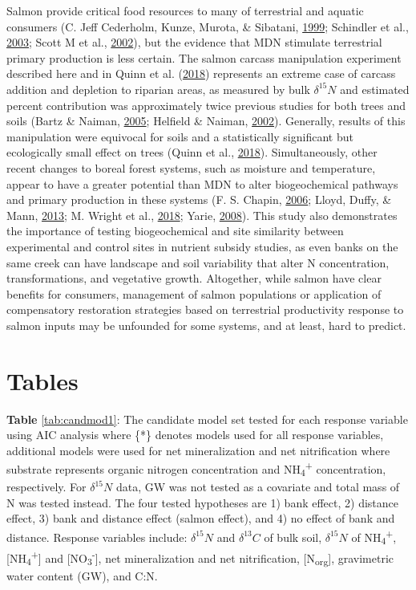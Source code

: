 \documentclass [11pt, proquest] {uwthesis}[2015/03/03]
\begin{document}
Salmon provide critical food resources to many of terrestrial and
aquatic consumers (C. Jeff Cederholm, Kunze, Murota, \& Sibatani,
\protect\hyperlink{ref-Cederholm1999}{1999}; Schindler et al.,
\protect\hyperlink{ref-Schindler2003}{2003}; Scott M et al.,
\protect\hyperlink{ref-Gende2002}{2002}), but the evidence that MDN
stimulate terrestrial primary production is less certain. The salmon
carcass manipulation experiment described here and in Quinn et al.
(\protect\hyperlink{ref-Quinn2018}{2018}) represents an extreme case of
carcass addition and depletion to riparian areas, as measured by bulk
\(\delta^{15}N\) and estimated percent contribution was approximately
twice previous studies for both trees and soils (Bartz \& Naiman,
\protect\hyperlink{ref-Bartz2005}{2005}; Helfield \& Naiman,
\protect\hyperlink{ref-Helfield2002}{2002}). Generally, results of this
manipulation were equivocal for soils and a statistically significant
but ecologically small effect on trees (Quinn et al.,
\protect\hyperlink{ref-Quinn2018}{2018}). Simultaneously, other recent
changes to boreal forest systems, such as moisture and temperature,
appear to have a greater potential than MDN to alter biogeochemical
pathways and primary production in these systems (F. S. Chapin,
\protect\hyperlink{ref-Chapin2006}{2006}; Lloyd, Duffy, \& Mann,
\protect\hyperlink{ref-Lloyd2013}{2013}; M. Wright et al.,
\protect\hyperlink{ref-Wright2018}{2018}; Yarie,
\protect\hyperlink{ref-Yarie2008}{2008}). This study also demonstrates
the importance of testing biogeochemical and site similarity between
experimental and control sites in nutrient subsidy studies, as even
banks on the same creek can have landscape and soil variability that
alter N concentration, transformations, and vegetative growth.
Altogether, while salmon have clear benefits for consumers, management
of salmon populations or application of compensatory restoration
strategies based on terrestrial productivity response to salmon inputs
may be unfounded for some systems, and at least, hard to predict.

\hypertarget{tables}{\section{Tables}\label{tables}}

\textbf{Table} \ref{tab:candmod1}: The candidate model set tested for
each response variable using AIC analysis where \{*\} denotes models
used for all response variables, additional models were used for net
mineralization and net nitrification where substrate represents organic
nitrogen concentration and NH\textsubscript{4}\textsuperscript{+}
concentration, respectively. For \(\delta^{15}N\) data, GW was not
tested as a covariate and total mass of N was tested instead. The four
tested hypotheses are 1) bank effect, 2) distance effect, 3) bank and
distance effect (salmon effect), and 4) no effect of bank and distance.
Response variables include: \(\delta^{15}N\) and \(\delta^{13}C\) of
bulk soil, \(\delta^{15}N\) of NH\textsubscript{4}\textsuperscript{+},
{[}NH\textsubscript{4}\textsuperscript{+}{]} and
{[}NO\textsubscript{3}\textsuperscript{-}{]}, net mineralization and net
nitrification, {[}N\textsubscript{org}{]}, gravimetric water content
(GW), and C:N.
\end{document}
